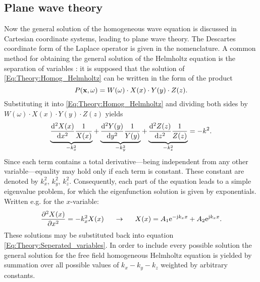 \subsection{Plane wave theory}
Now the general solution of the homogeneous wave equation is discussed in Cartesian coordinate systems, leading to plane wave theory.
The Descartes coordinate form of the Laplace operator is given in the nomenclature.
A common method for obtaining the general solution of the Helmholtz equation is the separation of variables \cite{Devaney2012}: 
it is supposed that the solution of \eqref{Eq:Theory:Homog_Helmholtz} can be written in the form of the product
\begin{equation}
P(\mathbf{x},\omega) = W(\omega) \cdot X(x) \cdot Y(y) \cdot Z(z).
\label{Eq:Theory:Seperated_variables}
\end{equation}
Substituting it into \eqref{Eq:Theory:Homog_Helmholtz} and dividing both sides by $W(\omega) \cdot X(x) \cdot Y(y) \cdot Z(z)$ yields
\begin{equation}
\underbrace{\frac{\mathrm{d}^2 X(x)}{\mathrm{d} x^2}\frac{1}{X(x)}}_{-k_x^2} + 
\underbrace{\frac{\mathrm{d}^2 Y(y)}{\mathrm{d} y^2}\frac{1}{Y(y)}}_{-k_y^2} + 
\underbrace{\frac{\mathrm{d}^2 Z(z)}{\mathrm{d} z^2}\frac{1}{Z(z)}}_{-k_z^2}
= - k^2.
\label{Eq:Theory:Seperated_variables_expanded}
\end{equation}
Since each term contains a total derivative---being independent from any other variable---equality may hold only if each term is constant. 
These constant are denoted by $k_x^2, \, k_y^2, \,k_z^2$. 
Consequently, each part of the equation leads to a simple eigenvalue problem, for which the eigenfunction solution is given by exponentials. 
Written e.g. for the $x$-variable:
\begin{equation}
\frac{\partial^2 X(x)}{\partial x^2} = -k_x^2 X(x) \hspace{5mm} \rightarrow \hspace{5mm} X(x) = A_1 \mathrm{e}^{-\mathrm{j} k_x x} + A_2 \mathrm{e}^{\mathrm{j} k_x x}.
\end{equation}
These solutions may be substituted back into equation \eqref{Eq:Theory:Seperated_variables}. 
In order to include every possible solution the general solution for the free field homogeneous Helmholtz equation is yielded by summation over all possible values of $k_x-k_y-k_z$ weighted by arbitrary constants. 
